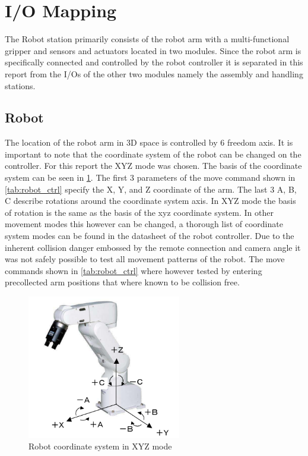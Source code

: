 \documentclass{article}
\begin{document}
\section{I/O Mapping}
The Robot station primarily consists of the robot arm with a multi-functional gripper and sensors and actuators located in two modules. Since the robot arm is specifically connected and controlled by the robot controller it is separated in this report from the I/Os of the other two modules namely the assembly and handling stations. 

\subsection{Robot}
The location of the robot arm in 3D space is controlled by 6 freedom axis. It is important to note that the coordinate system of the robot can be changed on the controller. For this report the XYZ mode was chosen. The basis of the coordinate system can be seen in \ref{fig:robot_axis}. The first 3 parameters of the move command shown in \ref{tab:robot_ctrl} specify the X, Y, and Z coordinate of the arm. The last 3 A, B, C describe rotations around the coordinate system axis. In XYZ mode the basis of rotation is the same as the basis of the xyz coordinate system. In other movement modes this however can be changed, a thorough list of coordinate system modes can be found in the datasheet of the robot controller.\newline
Due to the inherent collision danger embossed by the remote connection and camera angle it was not safely possible to test all movement patterns of the robot. The move commands shown in \ref{tab:robot_ctrl} where however tested by entering precollected arm positions that where known to be collision free.
\begin{figure}[htp]
	\centering
	\includegraphics[width=0.6\textwidth]{images/robot_axis.png}
	\caption{Robot coordinate system in XYZ mode}
	\label{fig:robot_axis}
\end{figure}
\end{document}
